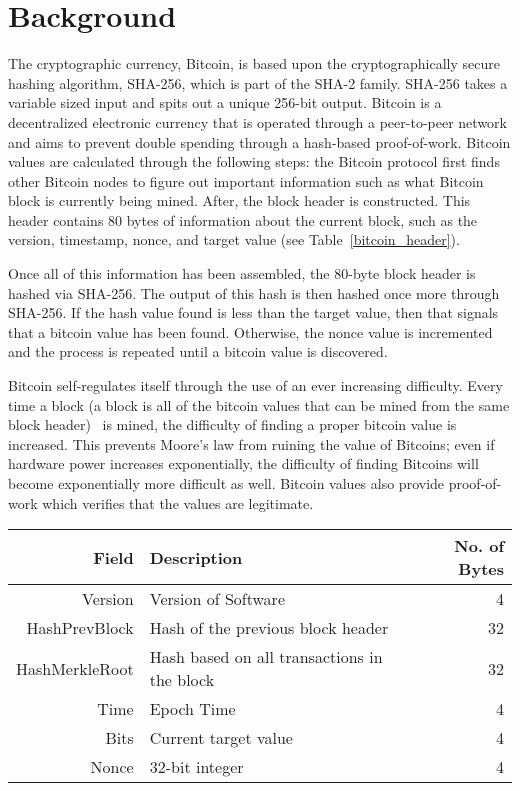 \section{Background}

The cryptographic currency, Bitcoin, is based upon the cryptographically secure hashing algorithm, SHA-256, which is part of the SHA-2 family.
SHA-256 takes a variable sized input and spits out a unique 256-bit output.
Bitcoin is a decentralized electronic currency that is operated through a peer-to-peer network and aims to prevent double spending through a hash-based proof-of-work.
Bitcoin values are calculated through the following steps: the Bitcoin protocol first finds other Bitcoin nodes to figure out important information such as what Bitcoin block is currently being mined.
After, the block header is constructed.
This header contains 80 bytes of information about the current block, such as the version, timestamp, nonce, and target value (see Table~\ref{bitcoin_header}).

Once all of this information has been assembled, the 80-byte block header is hashed via SHA-256.
The output of this hash is then hashed once more through SHA-256.
If the hash value found is less than the target value, then that signals that a bitcoin value has been found.
Otherwise, the nonce value is incremented and the process is repeated until a bitcoin value is discovered.

Bitcoin self-regulates itself through the use of an ever increasing difficulty.
Every time a block (a block is all of the bitcoin values that can be mined from the same block header)  is mined, the difficulty of finding a proper bitcoin value is increased.
This prevents Moore’s law from ruining the value of Bitcoins; even if hardware power increases exponentially, the difficulty of finding Bitcoins will become exponentially more difficult as well.
Bitcoin values also provide proof-of-work which verifies that the values are legitimate.

\begin{table*}
    \centering
\label{bitcoin_header}
\begin{tabular}{r| p{9cm} | r}
  \hline
  \hline
  {\bf Field} & {\bf Description} & {\bf No. of Bytes} \\
  \hline
  Version & Version of Software & 4 \\
  HashPrevBlock & Hash of the previous block header & 32 \\
  HashMerkleRoot & Hash based on all transactions in the block & 32 \\
  Time & Epoch Time & 4 \\
  Bits & Current target value & 4 \\
  Nonce & 32-bit integer & 4 \\
  \hline
\end{tabular}
\caption{The block header for a Bitcoin. These blocks are hashed twice using SHA-256 to determine whether or not the header (with a given nonce) represents a valid Bitcoin. Because the required value becomes harder and harder to match, more and more computation is required to mine additional Bitcoins.}
\end{table*}


